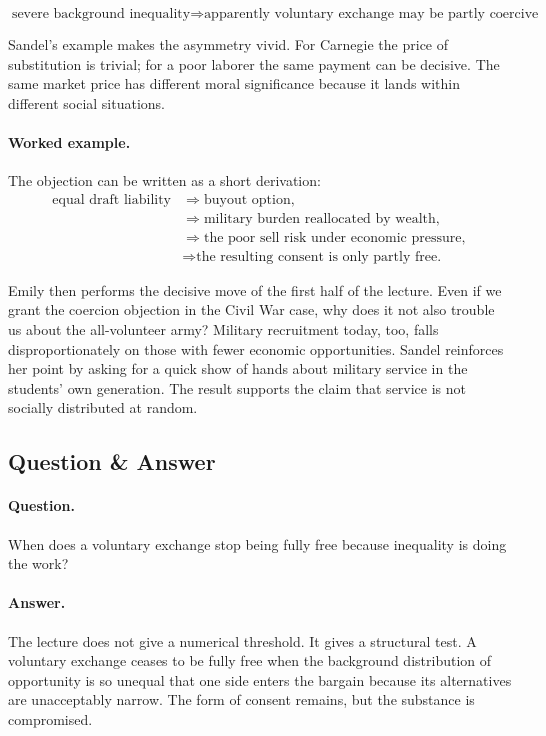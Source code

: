 \begin{equation}
\text{severe background inequality} \Longrightarrow
\text{apparently voluntary exchange may be partly coercive}
\end{equation}

Sandel's example makes the asymmetry vivid. For Carnegie the price of substitution is trivial; for a poor laborer the same payment can be decisive. The same market price has different moral significance because it lands within different social situations.

\paragraph{Worked example.} The objection can be written as a short derivation:
\begin{align}
\text{equal draft liability}
&\Longrightarrow \text{buyout option},\\
&\Longrightarrow \text{military burden reallocated by wealth},\\
&\Longrightarrow \text{the poor sell risk under economic pressure},\\
&\Longrightarrow \text{the resulting consent is only partly free.}
\end{align}

Emily then performs the decisive move of the first half of the lecture. Even if we grant the coercion objection in the Civil War case, why does it not also trouble us about the all-volunteer army? Military recruitment today, too, falls disproportionately on those with fewer economic opportunities. Sandel reinforces her point by asking for a quick show of hands about military service in the students' own generation. The result supports the claim that service is not socially distributed at random.

\subsection{Question \& Answer}

\paragraph{Question.} When does a voluntary exchange stop being fully free because inequality is doing the work?

\paragraph{Answer.} The lecture does not give a numerical threshold. It gives a structural test. A voluntary exchange ceases to be fully free when the background distribution of opportunity is so unequal that one side enters the bargain because its alternatives are unacceptably narrow. The form of consent remains, but the substance is compromised.

